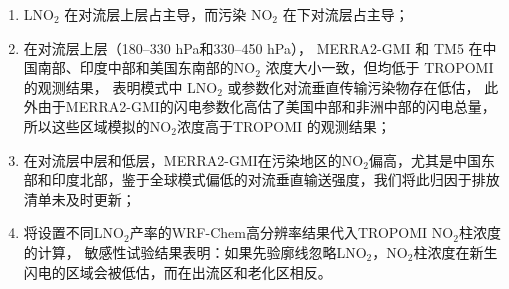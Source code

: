 \begin{enumerate}[label=（\arabic*）, labelindent=\parindent, leftmargin=0pt, widest=0, itemindent=*, topsep=0pt, partopsep=0pt, parsep=0pt]

\item LNO$_2$ 在对流层上层占主导，而污染 NO$_2$ 在下对流层占主导；

\item 在对流层上层（180--330 hPa和330--450 hPa），
MERRA2-GMI 和 TM5 在中国南部、印度中部和美国东南部的NO$_2$ 浓度大小一致，但均低于 TROPOMI 的观测结果，
表明模式中 LNO$_2$ 或参数化对流垂直传输污染物存在低估，
此外由于MERRA2-GMI的闪电参数化高估了美国中部和非洲中部的闪电总量，
所以这些区域模拟的NO$_2$浓度高于TROPOMI 的观测结果；

\item 在对流层中层和低层，MERRA2-GMI在污染地区的NO$_2$偏高，尤其是中国东部和印度北部，鉴于全球模式偏低的对流垂直输送强度，我们将此归因于排放清单未及时更新；

\item 将设置不同LNO$_2$产率的WRF-Chem高分辨率结果代入TROPOMI NO$_2$柱浓度的计算，
敏感性试验结果表明：如果先验廓线忽略LNO$_2$，NO$_2$柱浓度在新生闪电的区域会被低估，而在出流区和老化区相反。

\end{enumerate}
